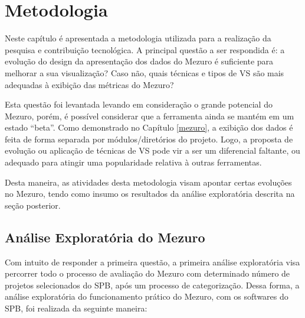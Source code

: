 \chapter{Metodologia}\label{metodologia}

Neste capítulo é apresentada a metodologia utilizada para a
realização da pesquisa e contribuição tecnológica. A principal questão
a ser respondida é: a evolução do design da apresentação dos dados do Mezuro
é suficiente para melhorar a sua visualização? Caso não, quais técnicas e
tipos de VS são mais adequadas à exibição das métricas do Mezuro?

Esta questão foi levantada levando em consideração o grande potencial do Mezuro,
porém, é possível considerar que a ferramenta ainda se mantém em um estado
``beta''. Como demonstrado no Capítulo \ref{mezuro}, a exibição dos dados é
feita de forma separada por módulos/diretórios do projeto. Logo, a proposta de
evolução ou aplicação de técnicas de VS pode vir a ser um diferencial faltante,
ou adequado para atingir uma popularidade relativa à outras ferramentas.

Desta maneira, as atividades desta metodologia visam apontar certas
evoluções no Mezuro, tendo como insumo os resultados da análise exploratória
descrita na seção posterior.

\section{Análise Exploratória do Mezuro}

Com intuito de responder a primeira questão, a primeira análise exploratória
visa percorrer todo o processo de avaliação do Mezuro com determinado número
de projetos selecionados do SPB, após um processo de categorização.
%
Dessa forma, a análise exploratória do funcionamento prático do Mezuro, com os
softwares do SPB, foi realizada da seguinte maneira:

